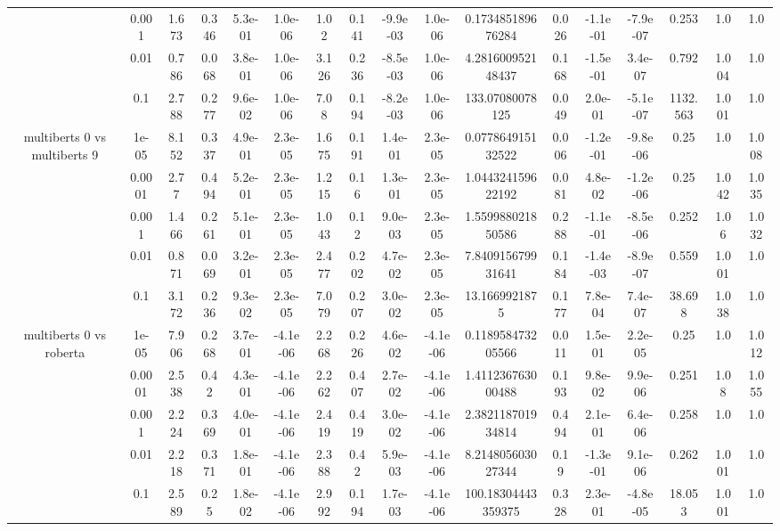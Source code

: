\begin{tabular}{|c|c|c|c|c|c|c|c|c|c|c|c|c|c|c|c|c|}
 & 0.001 & 1.673 & 0.346 & 5.3e-01 & 1.0e-06 & 1.02 & 0.141 & -9.9e-03 & 1.0e-06 & 0.173485189676284 & 0.026 & -1.1e-01 & -7.9e-07 & 0.253 & 1.0 & 1.0 \\
 & 0.01 & 0.786 & 0.068 & 3.8e-01 & 1.0e-06 & 3.126 & 0.236 & -8.5e-03 & 1.0e-06 & 4.281600952148437 & 0.168 & -1.5e-01 & 3.4e-07 & 0.792 & 1.004 & 1.0 \\
 & 0.1 & 2.788 & 0.277 & 9.6e-02 & 1.0e-06 & 7.08 & 0.194 & -8.2e-03 & 1.0e-06 & 133.07080078125 & 0.049 & 2.0e-01 & -5.1e-07 & 1132.563 & 1.001 & 1.0 \\
\hline
\multirow{5}{*}{multiberts 0 vs multiberts 9} & 1e-05 & 8.152 & 0.337 & 4.9e-01 & 2.3e-05 & 1.675 & 0.191 & 1.4e-01 & 2.3e-05 & 0.077864915132522 & 0.006 & -1.2e-01 & -9.8e-06 & 0.25 & 1.0 & 1.008 \\
 & 0.0001 & 2.77 & 0.494 & 5.2e-01 & 2.3e-05 & 1.215 & 0.16 & 1.3e-01 & 2.3e-05 & 1.044324159622192 & 0.081 & 4.8e-02 & -1.2e-06 & 0.25 & 1.042 & 1.035 \\
 & 0.001 & 1.466 & 0.261 & 5.1e-01 & 2.3e-05 & 1.043 & 0.12 & 9.0e-03 & 2.3e-05 & 1.559988021850586 & 0.288 & -1.1e-01 & -8.5e-06 & 0.252 & 1.06 & 1.032 \\
 & 0.01 & 0.871 & 0.069 & 3.2e-01 & 2.3e-05 & 2.477 & 0.202 & 4.7e-02 & 2.3e-05 & 7.840915679931641 & 0.184 & -1.4e-03 & -8.9e-07 & 0.559 & 1.001 & 1.0 \\
 & 0.1 & 3.172 & 0.236 & 9.3e-02 & 2.3e-05 & 7.079 & 0.207 & 3.0e-02 & 2.3e-05 & 13.1669921875 & 0.177 & 7.8e-04 & 7.4e-07 & 38.698 & 1.038 & 1.0 \\
\hline
\multirow{5}{*}{multiberts 0 vs roberta } & 1e-05 & 7.906 & 0.268 & 3.7e-01 & -4.1e-06 & 2.268 & 0.226 & 4.6e-02 & -4.1e-06 & 0.118958473205566 & 0.011 & 1.5e-01 & 2.2e-05 & 0.25 & 1.0 & 1.012 \\
 & 0.0001 & 2.538 & 0.42 & 4.3e-01 & -4.1e-06 & 2.262 & 0.407 & 2.7e-02 & -4.1e-06 & 1.411236763000488 & 0.193 & 9.8e-02 & 9.9e-06 & 0.251 & 1.08 & 1.055 \\
 & 0.001 & 2.224 & 0.369 & 4.0e-01 & -4.1e-06 & 2.419 & 0.419 & 3.0e-02 & -4.1e-06 & 2.382118701934814 & 0.494 & 2.1e-01 & 6.4e-06 & 0.258 & 1.0 & 1.0 \\
 & 0.01 & 2.218 & 0.371 & 1.8e-01 & -4.1e-06 & 2.388 & 0.42 & 5.9e-03 & -4.1e-06 & 8.214805603027344 & 0.19 & -1.3e-01 & 9.1e-06 & 0.262 & 1.001 & 1.0 \\
 & 0.1 & 2.589 & 0.25 & 1.8e-02 & -4.1e-06 & 2.992 & 0.194 & 1.7e-03 & -4.1e-06 & 100.18304443359375 & 0.328 & 2.3e-01 & -4.8e-05 & 18.053 & 1.001 & 1.0 \\

\end{tabular}
